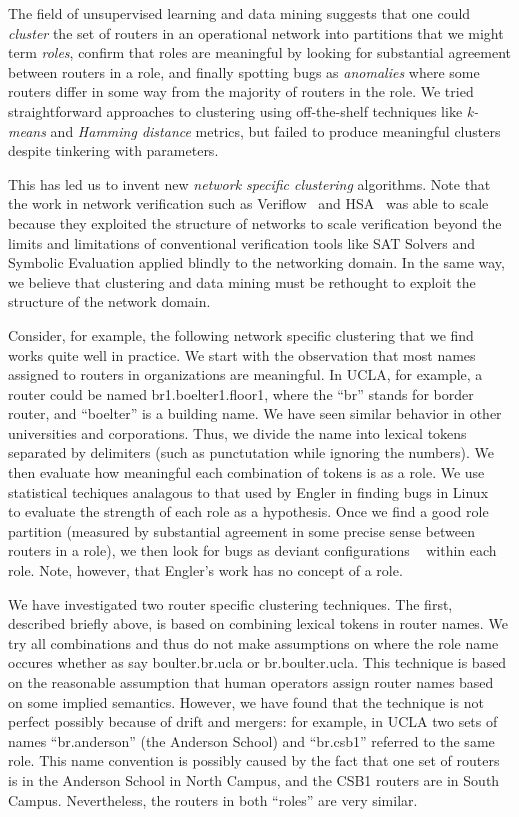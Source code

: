 The field of unsupervised learning and data mining suggests that one could {\em cluster} the set of routers in an operational network into partitions that we might term {\em roles}, confirm that roles are meaningful by looking for substantial agreement  between routers in a role, and finally spotting bugs as {\em anomalies} where some routers differ in some way from the majority of routers in the role.  We tried
straightforward approaches to clustering using off-the-shelf techniques like {\em k-means} and {\em Hamming distance} metrics, but failed to produce meaningful clusters despite tinkering with parameters.

This has led us to invent new {\em network specific clustering} algorithms. Note that the work in network verification such as Veriflow~\cite{veriflow}
and HSA~\cite{hsa} was able to scale because they exploited the structure of networks to scale verification beyond the limits and limitations of 
conventional verification tools like SAT Solvers and Symbolic Evaluation applied blindly to the networking domain.  In the same way,
we believe that clustering and data mining must be rethought to exploit the structure of the network domain.

Consider, for example, the following network specific clustering that we find works quite well in practice.  We start with the
observation that most names assigned to routers in organizations are meaningful.  In UCLA, for example, a router
could be named br1.boelter1.floor1, where the ``br'' stands for border router, and ``boelter'' is a building name. We have seen
similar behavior in other universities and corporations.  Thus, we divide the name into lexical tokens separated
by delimiters (such as punctutation while ignoring the numbers).  We then evaluate how meaningful each combination of tokens is as a role.  We use statistical techiques analagous to that used by Engler in finding bugs in Linux ~\cite{engler} to evaluate the strength of each role as a hypothesis.  Once we find a good role partition (measured by substantial agreement in some precise sense between routers in a role), we then look for bugs as deviant configurations ~\cite{engler} within each role.    Note, however, that Engler's work has no concept of a role.

We have investigated two router specific clustering techniques. The first, described briefly above, is
based on combining lexical tokens in router names.  We try all combinations and thus do not make assumptions on where the role name occures whether as say boulter.br.ucla or br.boulter.ucla.  This technique is based on the reasonable assumption that human operators assign router names based on some implied semantics.  However, we have found that the technique is not perfect possibly because of drift and mergers: for example, in UCLA two sets of names ``br.anderson'' (the Anderson School) and ``br.csb1'' referred to the same role.  This name convention is possibly caused by the fact that one set of routers is in the Anderson School in North Campus, and the CSB1 routers are in South Campus.  Nevertheless, the routers in both ``roles'' are very similar.  

